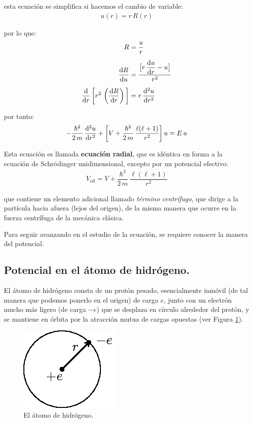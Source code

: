 esta ecuación se simplifica si hacemos el cambio de variable:
\begin{align}
u(r) = r \, R(r)
\label{eq:ecuacion_04_36}
\end{align}

por lo que:
\begin{align*}
R &= \dfrac{u}{r} \\[0.5em]
\dv{R}{u} &= \dfrac{ \big[ r \, \displaystyle \dv{u}{r} - u \big]}{r^{2}} \\[0.5em]
\dv{r} \, \bigg[ r^{2} \, \left( \dv{R}{r} \right) \bigg] &= r \, \dv[2]{u}{r}
\end{align*}

por tanto:
\begin{align}
- \dfrac{\hbar^{2}}{2 \, m} \, \dv[2]{u}{r} + \bigg[ V + \dfrac{\hbar^{2}}{2 \, m} \,\dfrac{\ell (\ell + 1)}{r^{2}} \bigg] \, u =  E \, u
\label{eq:ecuacion_04_37}
\end{align}

Esta ecuación es llamada \textbf{ecuación radial}, que es idéntica en forma a la ecuación de Schrödinger unidimensional, excepto por un potencial efectivo:
\begin{align*}
V_{\mbox{eff}} = V + \dfrac{\hbar^{2}}{2 \, m} \,\dfrac{\ell (\ell + 1)}{r^{2}}
\label{eq:ecuacion_04_38}
\end{align*}

que contiene un elemento adicional llamado \emph{término centrífugo}, que dirige a la partícula hacia afuera (lejos del origen), de la misma manera que ocurre en la fuerza centrífuga de la mecánica clásica.
\par
Para seguir avanzando en el estudio de la ecuación, se requiere conocer la manera del potencial.

\subsection{Potencial en el átomo de hidrógeno.}

El átomo de hidrógeno consta de un protón pesado, esencialmente inmóvil (de tal manera que podemos ponerlo en el origen) de carga $e$, junto con un electrón mucho más ligero (de carga $-e$) que se desplaza en círculo alrededor del protón, y se mantiene en órbita por la atracción mutua de cargas opuestas (ver Figura \ref{fig:figura_01}).
\begin{figure}[H]
    \centering
    \includegraphics[scale=1.5]{Imagenes/atomohidrogeno.eps}
    \caption{El átomo de hidrógeno.}
    \label{fig:figura_01}
\end{figure}

